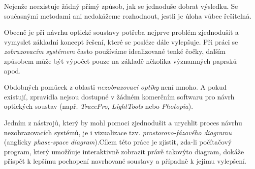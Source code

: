 Nejenže neexistuje žádný přímý způsob, jak se jednoduše dobrat výsledku. Se současnými metodami ani nedokážeme rozhodnout, jestli je úloha vůbec řešitelná.\src

Obecně je při návrhu optické soustavy potřeba nejprve problém zjednodušit a vymyslet základní koncept řešení, které se posléze dále vylepšuje. Při práci se \emph{zobrazovacím systémem} často používáme idealizované tenké čočky, dalším způsobem může být výpočet pouze na základě několika významných paprsků apod.

Obdobných pomůcek z oblasti \emph{nezobrazovací optiky} není mnoho. A pokud existují, zpravidla nejsou dostupné v žádném komerčním softwaru pro návrh optických soustav (např. \emph{TracePro}, \emph{LightTools} nebo \emph{Photopia}).\src

Jedním z nástrojů, který by mohl pomoci zjednodušit a urychlit proces návrhu nezobrazovacích systémů, je i vizualizace tzv. \emph{prostorovo-fázového diagramu} (anglicky \emph{phase-space diagram}).\src Cílem této práce je zjistit, zda-li počítačový program, který umožňuje interaktivně zobrazit právě takovýto diagram, dokáže přispět k lepšímu pochopení navrhované soustavy a případně k jejímu vylepšení.